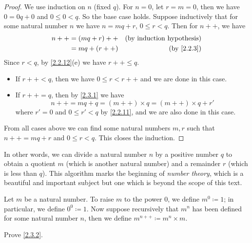 \begin{proof}
  We use induction on \(n\) (fixed \(q\)).
  For \(n = 0\), let \(r = m = 0\), then we have \(0 = 0q + 0\) and \(0 \leq 0 < q\).
  So the base case holds.
  Suppose inductively that for some natural number \(n\) we have \(n = mq + r\), \(0 \leq r < q\).
  Then for \(n++\), we have
  \begin{align*}
    n++ & = (mq + r)++ & \text{(by induction hypothesis)} \\
        & = mq + (r++) & \text{(by \cref{2.2.3})}         \\
  \end{align*}
  Since \(r < q\), by \cref{2.2.12}(e) we have \(r++ \leq q\).
  \begin{itemize}
    \item If \(r++ < q\), then we have \(0 \leq r < r++\) and we are done in this case.
    \item If \(r++ = q\), then by \cref{2.3.1} we have
          \[
            n++ = mq + q = (m++) \times q = (m++) \times q + r'
          \]
          where \(r' = 0\) and \(0 \leq r' < q\) by \cref{2.2.11}, and we are also done in this case.
  \end{itemize}
  From all cases above we can find some natural numbers \(m, r\) such that \(n++ = mq + r\) and \(0 \leq r < q\).
  This closes the induction.
\end{proof}

\begin{rmk}\label{2.3.10}
  In other words, we can divide a natural number \(n\) by a positive number \(q\) to obtain a quotient \(m\) (which is another natural number) and a remainder \(r\) (which is less than \(q\)).
  This algorithm marks the beginning of \emph{number theory}, which is a beautiful and important subject but one which is beyond the scope of this text.
\end{rmk}

\begin{defn}\label{2.3.11}
  Let \(m\) be a natural number.
  To raise \(m\) to the power \(0\), we define \(m^0 \coloneqq 1\); in particular, we define \(0^0 \coloneqq 1\).
  Now suppose recursively that \(m^n\) has been defined for some natural number \(n\), then we define \(m^{n++} \coloneqq m^n \times m\).
\end{defn}

\exercisesection

\begin{ex}\label{ex:2.3.1}
  Prove \cref{2.3.2}.
\end{ex}

